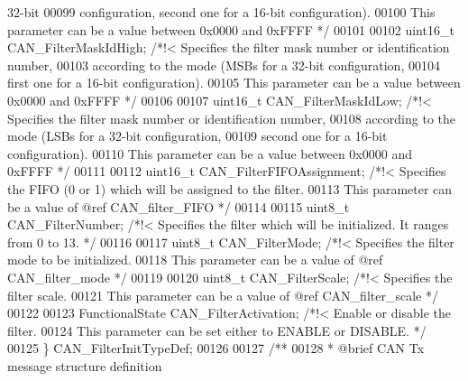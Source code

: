 \begin{DoxyCode}
{       32-bit}
00099 \textcolor{comment}{                                              configuration, second one for a 16-bit configuration).}
00100 \textcolor{comment}{                                              This parameter can be a value between 0x0000 and 0xFFFF
       */}
00101 
00102   uint16\_t CAN_FilterMaskIdHigh;     \textcolor{comment}{/*!< Specifies the filter mask number or identification number,}
00103 \textcolor{comment}{                                              according to the mode (MSBs for a 32-bit configuration,}
00104 \textcolor{comment}{                                              first one for a 16-bit configuration).}
00105 \textcolor{comment}{                                              This parameter can be a value between 0x0000 and 0xFFFF
       */}
00106 
00107   uint16\_t CAN_FilterMaskIdLow;      \textcolor{comment}{/*!< Specifies the filter mask number or identification number,}
00108 \textcolor{comment}{                                              according to the mode (LSBs for a 32-bit configuration,}
00109 \textcolor{comment}{                                              second one for a 16-bit configuration).}
00110 \textcolor{comment}{                                              This parameter can be a value between 0x0000 and 0xFFFF
       */}
00111 
00112   uint16\_t CAN_FilterFIFOAssignment; \textcolor{comment}{/*!< Specifies the FIFO (0 or 1) which will be assigned to the
       filter.}
00113 \textcolor{comment}{                                              This parameter can be a value of @ref CAN\_filter\_FIFO */}
00114 
00115   uint8\_t CAN_FilterNumber;          \textcolor{comment}{/*!< Specifies the filter which will be initialized. It ranges
       from 0 to 13. */}
00116 
00117   uint8\_t CAN_FilterMode;            \textcolor{comment}{/*!< Specifies the filter mode to be initialized.}
00118 \textcolor{comment}{                                              This parameter can be a value of @ref CAN\_filter\_mode */}
00119 
00120   uint8\_t CAN_FilterScale;           \textcolor{comment}{/*!< Specifies the filter scale.}
00121 \textcolor{comment}{                                              This parameter can be a value of @ref CAN\_filter\_scale
       */}
00122 
00123   FunctionalState CAN_FilterActivation; \textcolor{comment}{/*!< Enable or disable the filter.}
00124 \textcolor{comment}{                                              This parameter can be set either to ENABLE or DISABLE.
       */}
00125 \} CAN\_FilterInitTypeDef;
00126 
00127 \textcolor{comment}{/** }
00128 \textcolor{comment}{  * @brief  CAN Tx message structure definition  }

\end{DoxyCode}
